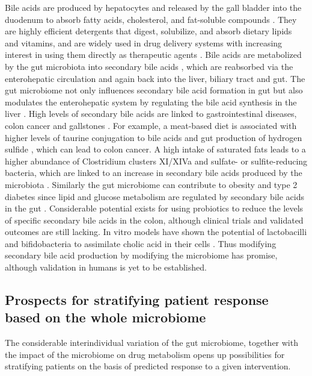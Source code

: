 Bile acids are produced by hepatocytes and released by the gall bladder into the duodenum to absorb fatty acids, cholesterol, and fat-soluble compounds \cite{RN4147}. They are highly efficient detergents that digest, solubilize, and absorb dietary lipids and vitamins, and are widely used in drug delivery systems with increasing interest in using them directly as therapeutic agents \cite{RN4148}. Bile acids are metabolized by the gut microbiota into secondary bile acids \cite{RN4149}, which  are reabsorbed  via the enterohepatic circulation and again back into the liver, biliary tract and gut. The gut microbiome not only influences secondary bile acid formation in gut but also modulates the enterohepatic system by regulating the bile acid synthesis in the liver \cite{RN4150}. High levels of secondary bile acids are linked to gastrointestinal diseases, colon cancer and gallstones \cite{RN4152}. For example, a meat-based diet is associated with higher levels of taurine conjugation to bile acids and gut production of hydrogen sulfide \cite{RN4153}, which can lead to colon cancer. A high intake of saturated fats leads to a higher abundance of Clostridium clusters XI/XIVa and sulfate- or sulfite-reducing bacteria, which are linked to an increase in secondary bile acids produced by the microbiota \cite{RN4154}. Similarly the gut microbiome can contribute to obesity and type 2 diabetes since lipid and glucose metabolism are regulated by secondary bile acids in the gut \cite{RN4155}. Considerable potential exists for using probiotics to reduce the levels of specific secondary bile acids in the colon, although clinical trials and validated outcomes are still lacking. In vitro models have shown the potential of lactobacilli and bifidobacteria to assimilate cholic acid in their cells \cite{RN4156}. Thus modifying secondary bile acid production by modifying the microbiome  has promise, although validation in humans is yet to be established.

\subsection{Prospects for stratifying patient response based on the whole microbiome}

The considerable interindividual variation of the gut microbiome, together with the impact of the microbiome on drug metabolism opens up possibilities for stratifying patients on the basis of predicted response to a given intervention. 

